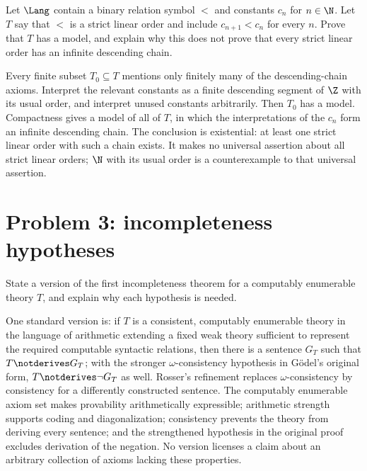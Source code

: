 Let \(\Lang\) contain a binary relation symbol \(<\) and constants
\(c_n\) for \(n\in\N\).  Let \(T\) say that \(<\) is a strict linear order and
include \(c_{n+1}<c_n\) for every \(n\).  Prove that \(T\) has a model, and
explain why this does not prove that every strict linear order has an infinite
descending chain.

\begin{solution}
Every finite subset \(T_0\subseteq T\) mentions only finitely many of the
descending-chain axioms.  Interpret the relevant constants as a finite
descending segment of \(\Z\) with its usual order, and interpret unused
constants arbitrarily.  Then \(T_0\) has a model.  Compactness gives a model of
all of \(T\), in which the interpretations of the \(c_n\) form an infinite
descending chain.  The conclusion is existential: at least one strict linear
order with such a chain exists.  It makes no universal assertion about all
strict linear orders; \(\N\) with its usual order is a counterexample to that
universal assertion.
\end{solution}

\section{Problem 3: incompleteness hypotheses}
\label{sec:qualifying-problems-03}
\label{prob:incompleteness}

State a version of the first incompleteness theorem for a computably enumerable
theory \(T\), and explain why each hypothesis is needed.

\begin{solution}
One standard version is: if \(T\) is a consistent, computably enumerable
theory in the language of arithmetic extending a fixed weak theory sufficient
to represent the required computable syntactic relations, then there is a
sentence \(G_T\) such that \(T\notderives G_T\); with the stronger
\(\omega\)-consistency hypothesis in G\"odel's original form,
\(T\notderives\neg G_T\) as well.  Rosser's refinement replaces
\(\omega\)-consistency by consistency for a differently constructed sentence.
The computably enumerable axiom set makes provability arithmetically expressible;
arithmetic strength supports coding and diagonalization; consistency prevents
the theory from deriving every sentence; and the strengthened hypothesis in
the original proof excludes derivation of the negation.  No version licenses a
claim about an arbitrary collection of axioms lacking these properties.
\end{solution}

